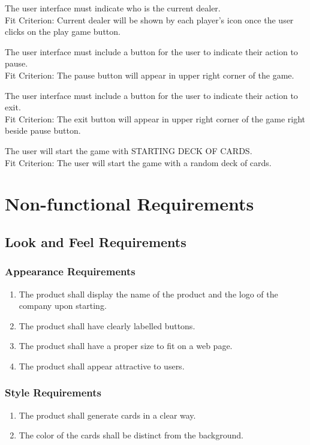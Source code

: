 \documentclass[12pt, titlepage]{article}
\begin{document}
\begin{FR}
\item The user interface must indicate who is the current dealer.\\
Fit Criterion: Current dealer will be shown by each player's icon once the user clicks on the play game button.
\item The user interface must include a button for the user to indicate their action to pause.\\
Fit Criterion: The pause button will appear in upper right corner of the game.
\item The user interface must include a button for the user to indicate their action to exit.\\
Fit Criterion: The exit button will appear in upper right corner of the game right beside pause button.
\item The user will start the game with STARTING DECK OF CARDS.\\
Fit Criterion: The user will start the game with a random deck of cards.

\end{FR}

\FloatBarrier
\section{Non-functional Requirements}

\subsection{Look and Feel Requirements}
\subsubsection{Appearance Requirements}
\begin{enumerate}
    \item The product shall display the name of the product and the logo of the company upon starting.
    \item The product shall have clearly labelled buttons.
    \item The product shall have a proper size to fit on a web page.
    \item The product shall appear attractive to users.
\end{enumerate}

\subsubsection{Style Requirements}
\begin{enumerate}
    \item The product shall generate cards in a clear way.
    \item The color of the cards shall be distinct from the background. 
\end{enumerate}
\end{document}
